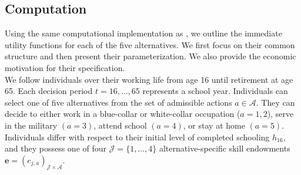 \subsection{Computation}\label{Appendix computation}\FloatBarrier
Using the same computational implementation as , we outline the immediate utility functions for each of the five alternatives. We first focus on their common structure and then present their parameterization. We also provide the economic motivation for their specification.\\

\noindent We follow individuals over their working life from age 16 until retirement at age 65. Each decision period $t = 16, \dots, 65$  represents a school year. Individuals can select one of five alternatives from the set of admissible actions $a\in\mathcal{A}$. They can decide to either work in a blue-collar or white-collar occupation ($a = 1, 2$), serve in the military $(a = 3)$, attend school $(a = 4)$, or stay at home $(a = 5)$.\\

\noindent Individuals differ with respect to their initial level of completed schooling $h_{16}$, and they possess one of four $\mathcal{J} = \{1, \hdots, 4\}$ alternative-specific skill endowments $\bm{e} = \left(e_{j,a}\right)_{\mathcal{J} \times \mathcal{A}}$.\\

